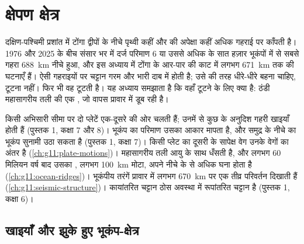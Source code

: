 \chapter{क्षेपण क्षेत्र}\label{ch:g11:subduction-zones}

दक्षिण-पश्चिमी प्रशांत में टोंगा द्वीपों के नीचे पृथ्वी कहीं और की अपेक्षा
कहीं अधिक गहराई पर काँपती है। 1976 और 2025 के बीच संसार भर में दर्ज
परिमाण 6 या उससे अधिक के सात हज़ार भूकंपों में से सबसे गहरा
\qty{688}{km} नीचे हुआ, और इस अध्याय में टोंगा के आर-पार की काट में लगभग \qty{671}{km} तक
की घटनाएँ हैं। ऐसी गहराइयों पर चट्टान गरम और भारी
दाब में होती है; उसे  की तरह धीरे-धीरे बहना चाहिए, टूटना नहीं। फिर भी वह
टूटती है। यह अध्याय समझाता है कि वहाँ टूटने के लिए क्या है: ठंडी महासागरीय
तली की एक , जो वापस प्रावार में डूब रही है।

\begin{recall}
किसी अभिसारी सीमा पर दो प्लेटें एक-दूसरे की ओर चलती हैं; उनमें से कुछ के अनुदिश
गहरी खाइयाँ होती हैं (पुस्तक 1, कक्षा 7 और 8)। भूकंप का परिमाण
उसका आकार मापता है, और समुद्र के नीचे का भूकंप सुनामी उठा सकता है
(पुस्तक 1, कक्षा 7)। किसी प्लेट का दूसरी के सापेक्ष वेग उनके वेगों का
अंतर है (\cref{ch:g11:plate-motions})। महासागरीय तली
आयु के साथ धँसती है, और लगभग 60 मिलियन वर्ष बाद उसका , लगभग
\qty{100}{km} मोटा, अपने नीचे के  से अधिक घना होता है
(\cref{ch:g11:ocean-ridges})। भूकंपीय तरंगें प्रावार में लगभग \qty{670}{km} पर
एक तीव्र परिवर्तन दिखाती हैं (\cref{ch:g11:seismic-structure})। कायांतरित चट्टान
ठोस अवस्था में रूपांतरित चट्टान है (पुस्तक 1, कक्षा 6)।
\end{recall}

\section{खाइयाँ और झुके हुए भूकंप-क्षेत्र}

